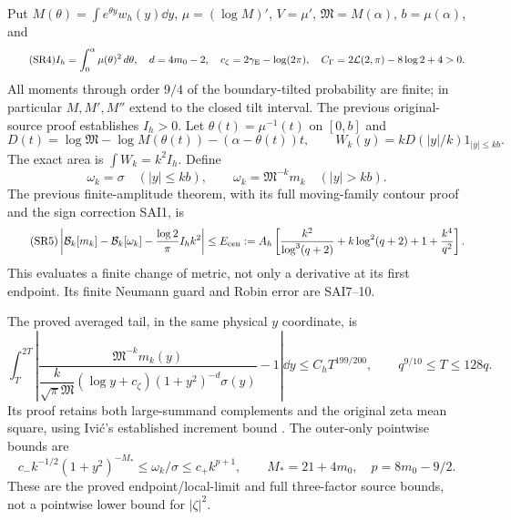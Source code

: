 Put $M(\theta)=\int e^{\theta y}w_h(y)\dd y$, $\mu=(\log M)'$,
$V=\mu'$, $\mathfrak M=M(\alpha)$, $b=\mu(\alpha)$, and
\begin{equation}\tag{SR4}
 I_h=\int_0^\alpha\mu(\theta)^2\,d\theta,\quad d=4m_0-2,\quad
 c_\zeta=2\gamma_{\rm E}-\log(2\pi),\quad
 C_\Gamma=2\mathcal L(2,\pi)-8\log2+4>0.
\end{equation}
All moments through order $9/4$ of the boundary-tilted probability are finite;
in particular $M,M',M''$ extend to the closed tilt interval. The previous
original-source proof establishes $I_h>0$.
Let $\theta(t)=\mu^{-1}(t)$ on $[0,b]$ and
\[
 D(t)=\log\mathfrak M-\log M(\theta(t))-(\alpha-\theta(t))t,
 \qquad W_k(y)=kD(|y|/k)1_{|y|\le kb}.
\]
The exact area is $\int W_k=k^2I_h$. Define
\[
 \omega_k=\sigma\quad(|y|\le kb),\qquad
 \omega_k=\mathfrak M^{-k}m_k\quad(|y|>kb).
\]
The previous finite-amplitude theorem, with its full moving-family contour
proof and the sign correction SAI1, is
\begin{equation}\tag{SR5}
 \left|\mathcal B_k[m_k]-\mathcal B_k[\omega_k]
       -\frac{\log2}{\pi}I_hk^2\right|
 \le E_{\rm cen}:=A_h\left[
 \frac{k^2}{\log^3(q+2)}+k\log^2(q+2)+1+\frac{k^4}{q^2}\right].
\end{equation}
This evaluates a finite change of metric, not only a derivative at its first
endpoint. Its finite Neumann guard and Robin error are SAI7--10.

The proved averaged tail, in the same physical $y$ coordinate, is
\begin{equation}\tag{SR6}
 \int_T^{2T}\left|
 \frac{\mathfrak M^{-k}m_k(y)}
 {\dfrac{k}{\sqrt\pi\mathfrak M}(\log y+c_\zeta)
 (1+y^2)^{-d}\sigma(y)}-1\right|\dd y
 \le C_hT^{199/200},\qquad q^{9/10}\le T\le128q.
\end{equation}
Its proof retains both large-summand complements and the original zeta
mean square, using Ivi\'c's established increment bound \cite{a02sr:Ivic}.
The outer-only pointwise bounds are
\begin{equation}\tag{SR7}
 c_-k^{-1/2}(1+y^2)^{-M_*}\le\omega_k/\sigma
 \le c_+k^{p+1},\qquad M_*=21+4m_0,\quad p=8m_0-9/2.
\end{equation}
These are the proved endpoint/local-limit and full three-factor source bounds,
not a pointwise lower bound for $|\zeta|^2$.

